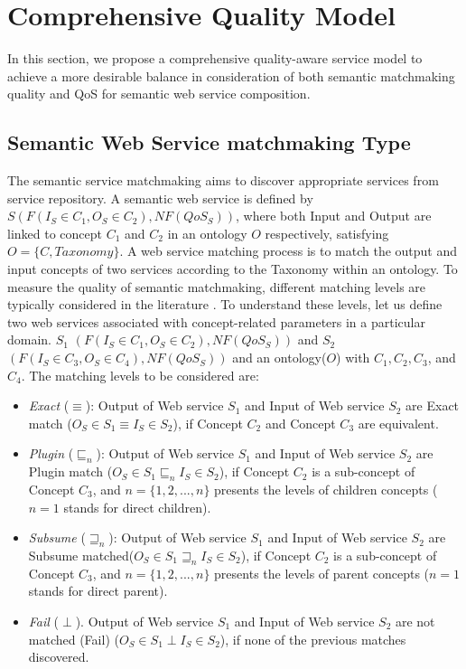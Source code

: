 \documentclass{IEEEtran}
\begin{document}
\section{Comprehensive Quality Model}\label{qswsc_approach}
In this section, we propose a comprehensive quality-aware service model to achieve a more desirable balance in consideration of both semantic matchmaking quality and QoS for semantic web service composition.

\subsection{Semantic Web Service matchmaking Type}\label{semantic Web service Discovery}
The semantic service matchmaking aims to discover appropriate services from service repository. A semantic web service is defined by $S(F(I_{S}\in C_{1}, O_{S}\in C_{2}), NF(QoS_{S}))$, where both Input and Output are linked to concept $C_{1}$ and $C_{2}$ in an ontology $O$ respectively, satisfying $O=\{C, Taxonomy\}$. A web service matching process is to match the output and input concepts of two services according to the Taxonomy within an ontology. To measure the quality of semantic matchmaking, different matching levels are typically considered in the literature \cite{paolucci2002semantic}. To understand these levels, let us define two web services associated with concept-related parameters in a particular domain. $S_{1}$ $(F(I_{S}\in C_{1}, O_{S}\in C_{2}), NF(QoS_{S}))$ and  $S_{2}$ $(F(I_{S}\in C_{3}, O_{S}\in C_{4}), NF(QoS_{S}))$ and an ontology($O$) with $C_{1},C_{2},C_{3}$, and $C_{4}$. The matching levels to be considered are:

\begin{itemize}
\item \textit{Exact} ($\equiv$): Output of Web service $S_{1}$ and Input of Web service $S_{2}$ are Exact match ($ O_{S} \in S_{1} \equiv I_{S} \in S_{2}$), if  Concept $C_{2}$ and Concept $C_{3}$ are equivalent.
\item \textit{Plugin} ($\sqsubseteq_{n}$): Output of Web service $S_{1}$ and Input of Web service $S_{2}$ are Plugin match ($O_{S} \in S_{1} \sqsubseteq_{n} I_{S} \in S_{2}$), if  Concept $C_{2}$ is a sub-concept of Concept $C_{3}$, and $n = \{1,2,...,n \}$ presents the levels of children concepts ($n=1$ stands for direct children).
\item \textit{Subsume} ($\sqsupseteq_{n}$): Output of Web service $S_{1}$ and Input of Web service $S_{2}$ are Subsume matched($O_{S} \in S_{1} \sqsupseteq_{n} I_{S} \in S_{2}$), if  Concept $C_{2}$ is a sub-concept of  Concept $C_{3}$, and $n = \{1,2,...,n \}$ presents the levels of parent concepts ($n=1$ stands for direct parent).
\item \textit{Fail} ($\perp$). Output of Web service $S_{1}$ and Input of Web service $S_{2}$ are not matched (Fail) ($O_{S} \in S_{1} \perp I_{S} \in S_{2}$), if none of the previous matches discovered.
\end{itemize}
\end{document}
